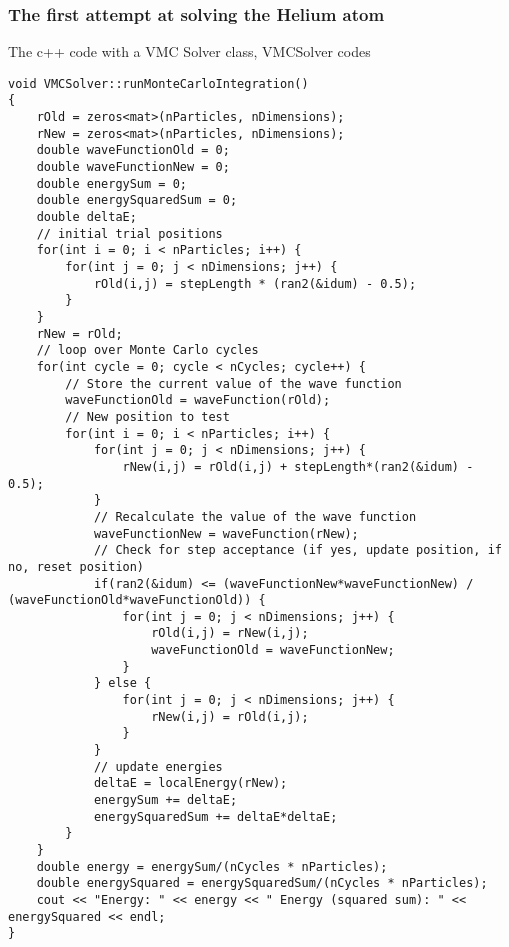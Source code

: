 \documentclass{beamer}
\begin{document}
\begin{frame}
\frametitle{The first attempt at solving the Helium atom}

\begin{block}{The c++ code with a VMC Solver class, VMCSolver codes }

\begin{verbatim}
void VMCSolver::runMonteCarloIntegration()
{
    rOld = zeros<mat>(nParticles, nDimensions);
    rNew = zeros<mat>(nParticles, nDimensions);
    double waveFunctionOld = 0;
    double waveFunctionNew = 0;
    double energySum = 0;
    double energySquaredSum = 0;
    double deltaE;
    // initial trial positions
    for(int i = 0; i < nParticles; i++) {
        for(int j = 0; j < nDimensions; j++) {
            rOld(i,j) = stepLength * (ran2(&idum) - 0.5);
        }
    }
    rNew = rOld;
    // loop over Monte Carlo cycles
    for(int cycle = 0; cycle < nCycles; cycle++) {
        // Store the current value of the wave function
        waveFunctionOld = waveFunction(rOld);
        // New position to test
        for(int i = 0; i < nParticles; i++) {
            for(int j = 0; j < nDimensions; j++) {
                rNew(i,j) = rOld(i,j) + stepLength*(ran2(&idum) - 0.5);
            }
            // Recalculate the value of the wave function
            waveFunctionNew = waveFunction(rNew);
            // Check for step acceptance (if yes, update position, if no, reset position)
            if(ran2(&idum) <= (waveFunctionNew*waveFunctionNew) / (waveFunctionOld*waveFunctionOld)) {
                for(int j = 0; j < nDimensions; j++) {
                    rOld(i,j) = rNew(i,j);
                    waveFunctionOld = waveFunctionNew;
                }
            } else {
                for(int j = 0; j < nDimensions; j++) {
                    rNew(i,j) = rOld(i,j);
                }
            }
            // update energies
            deltaE = localEnergy(rNew);
            energySum += deltaE;
            energySquaredSum += deltaE*deltaE;
        }
    }
    double energy = energySum/(nCycles * nParticles);
    double energySquared = energySquaredSum/(nCycles * nParticles);
    cout << "Energy: " << energy << " Energy (squared sum): " << energySquared << endl;
}
\end{verbatim}
\end{block}
\end{frame}
\end{document}
